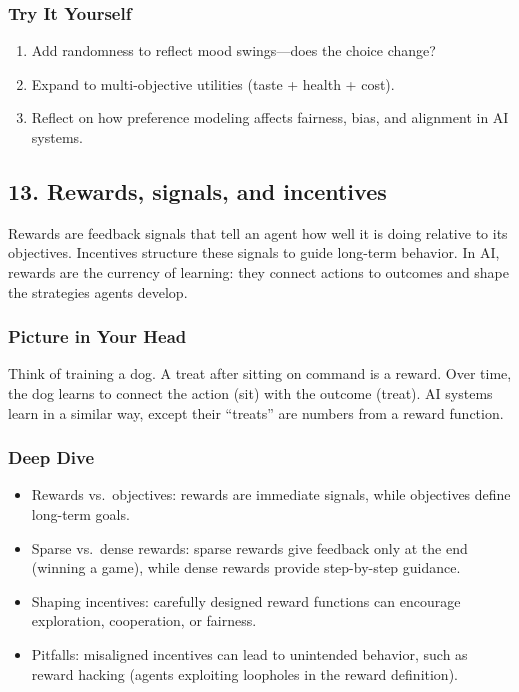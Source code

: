 \documentclass[
  letterpaper,
  DIV=11,
  numbers=noendperiod]{scrreprt}
\providecommand{\tightlist}{%
  \setlength{\itemsep}{0pt}\setlength{\parskip}{0pt}}
\begin{document}
\subsubsection{Try It Yourself}\label{try-it-yourself-11}

\begin{enumerate}
\def\labelenumi{\arabic{enumi}.}
\tightlist
\item
  Add randomness to reflect mood swings---does the choice change?
\item
  Expand to multi-objective utilities (taste + health + cost).
\item
  Reflect on how preference modeling affects fairness, bias, and
  alignment in AI systems.
\end{enumerate}

\subsection{13. Rewards, signals, and
incentives}\label{rewards-signals-and-incentives}

Rewards are feedback signals that tell an agent how well it is doing
relative to its objectives. Incentives structure these signals to guide
long-term behavior. In AI, rewards are the currency of learning: they
connect actions to outcomes and shape the strategies agents develop.

\subsubsection{Picture in Your Head}\label{picture-in-your-head-12}

Think of training a dog. A treat after sitting on command is a reward.
Over time, the dog learns to connect the action (sit) with the outcome
(treat). AI systems learn in a similar way, except their ``treats'' are
numbers from a reward function.

\subsubsection{Deep Dive}\label{deep-dive-12}

\begin{itemize}
\tightlist
\item
  Rewards vs.~objectives: rewards are immediate signals, while
  objectives define long-term goals.
\item
  Sparse vs.~dense rewards: sparse rewards give feedback only at the end
  (winning a game), while dense rewards provide step-by-step guidance.
\item
  Shaping incentives: carefully designed reward functions can encourage
  exploration, cooperation, or fairness.
\item
  Pitfalls: misaligned incentives can lead to unintended behavior, such
  as reward hacking (agents exploiting loopholes in the reward
  definition).
\end{itemize}
\end{document}
